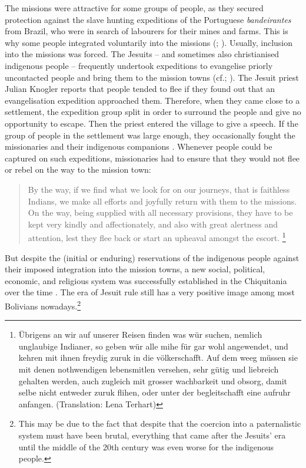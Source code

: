 
The missions were attractive for some groups of people, as they secured protection against the slave hunting expeditions of the Portuguese \textit{bandeirantes} from Brazil, who were in search of labourers for their mines and farms. This is why some people integrated voluntarily into the missions (\citealt[392]{TomichaCharupa2002}; \citealt[424, 425]{MatienzoAL2011}). Usually, inclusion into the missions was forced. The Jesuits – and sometimes also christianised indigenous people – frequently undertook expeditions to evangelise priorly uncontacted people and bring them to the mission towns (cf.\citealt[ch. VII]{TomichaCharupa2002}; \citealt[]{MatienzoAL2011}). The Jesuit priest Julian Knogler reports that people tended to flee if they found out that an evangelisation expedition approached them. Therefore, when they came close to a settlement, the expedition group split in order to surround the people and give no opportunity to escape. Then the priest entered the village to give a speech. If the group of people in the settlement was large enough, they occasionally fought the missionaries and their indigenous companions \citep[285]{Riester1970}. Whenever people could be captured on such expeditions, missionaries had to ensure that they would not flee or rebel on the way to the mission town:

\begin{quotation}
By the way, if we find what we look for on our journeys, that is faithless Indians, we make all efforts and joyfully return with them to the missions. On the way, being supplied with all necessary provisions, they have to be kept very kindly and affectionately, and also with great alertness and attention, lest they flee back or start an upheaval amongst the escort. \citep[Knogler 1767–1772 in][329]{Riester1970}\footnote{Übrigens an wir auf unserer Reisen finden was wür suchen, nemlich unglaubige Indianer, so geben wür alle mihe für gar wohl angewendet, und kehren mit ihnen freydig zuruk in die völ\-ker\-schafft. Auf dem weeg müssen sie mit denen nothwendigen lebensmitlen versehen, sehr gütig und liebreich gehalten werden, auch zugleich mit grosser wachbarkeit und obsorg, damit selbe nicht entweder zuruk flihen, oder unter der begleitschafft eine aufruhr anfangen. (Translation: Lena Terhart)}\end{quotation}


But despite the (initial or enduring) reservations of the indigenous people against their imposed integration into the mission towns, a new social, political, economic, and religious system was successfully established in the Chiquitania over the time \citep[65]{Tonelli2004}. The era of Jesuit rule still has a very positive image among most Bolivians nowadays.\footnote{This may be due to the fact that despite that the coercion into a paternalistic system must have been brutal, everything that came after the Jesuits’ era until the middle of the 20th century was even worse for the indigenous people.}

